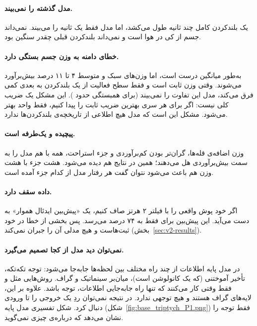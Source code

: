 \paragraph{مدل گذشته را نمی‌بیند.} یک بلندکردن کامل چند ثانیه طول می‌کشد، اما مدل فقط یک ثانیه را می‌بیند. نمی‌داند جسم از کی در هوا است و نمی‌داند بلندکردن قبلی چقدر سنگین بود.

\paragraph{خطای دامنه به وزن جسم بستگی دارد.}  به‌طور میانگین درست است، اما وزن‌های سبک و متوسط ۴ تا ۱۱ درصد بیش‌برآورد می‌شوند. وقتی وزن ثابت است و فقط سطح فعالیت از یک بلندکردن به بعدی کمی فرق می‌کند، مدل این تفاوت را نمی‌بیند (برای  همبستگی حدود ). این مشکل یک ضریب کلی نیست: اگر برای هر سری بهترین ضریب ثابت را پیدا کنیم،  فقط  واحد بهتر می‌شود. مشکل این است که مدل هیچ اطلاعی از تاریخچه‌ی بلندکردن‌ها ندارد.

\paragraph{ پیچیده و یک‌طرفه است.} وزن اضافه‌ی قله‌ها، گران‌تر بودن کم‌برآوردی و جزء استراحت، همه با هم مدل را به سمت بیش‌برآوردی هل می‌دهند؛ همین در نتایج هم دیده می‌شود. هشت جزء با هشت وزن هم باعث می‌شود نتوان گفت هر رفتار مدل از کدام جزء آمده است.

\paragraph{داده سقف دارد.} اگر خود پوش واقعی را با فیلتر  ۲ هرتز صاف کنیم، یک «پیش‌بین ایدئال هموار» به دست می‌آید. این پیش‌بین برای  فقط به  ۷۴ درصد می‌رسد. پس بخشی از خطا در خود ثبت‌هاست و هیچ مدلی آن را جبران نمی‌کند (بخش~\ref{sec:v2-results}).

\paragraph{نمی‌توان دید مدل از کجا تصمیم می‌گیرد.} در مدل پایه اطلاعات از چند راه مختلف بین لحظه‌ها جابه‌جا می‌شود: توجه تکه‌تکه، تأخیر آموختنی (که یک کانولوشن است)، میان‌بر سینماتیک و گراف. روش‌هایی مثل  و  فقط وقتی کار می‌کنند که تنها راه جابه‌جایی اطلاعات، توجه باشد. علاوه بر این، لایه‌های گراف  هستند و  هیچ  توجهی ندارد. در نتیجه نمی‌توان ردِ یک خروجی را تا ورودی دنبال کرد. شکل تفسیری مدل پایه (شکل~\ref{fig:base_triptych_P1.png}) فقط توجه  را نشان می‌دهد که درباره‌ی  چیزی نمی‌گوید.
